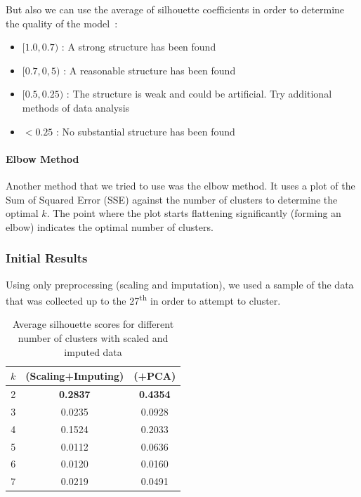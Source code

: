 But also we can use the average of silhouette coefficients in order to determine the quality of the model~\cite{silhouette}:
\begin{itemize}[topsep=0pt,noitemsep]
	\item $[1.0,0.7)$ : A strong structure has been found
	\item $[0.7,0,5)$ : A reasonable structure has been found
	\item $[0.5,0.25)$ : The structure is weak and could be artificial. Try additional methods of data analysis
	\item $< 0.25$ : No substantial structure has been found
\end{itemize}

\paragraph{Elbow Method}
Another method that we tried to use was the elbow method. It uses a plot of the Sum of Squared Error (SSE) against the number of clusters to determine the optimal $k$. The point where the plot starts flattening significantly (forming an elbow) indicates the optimal number of clusters. 

\subsubsection{Initial Results}
Using only preprocessing (scaling and imputation), we used a sample of the data that was collected up to the 27\textsuperscript{th} in order to attempt to cluster. 

\begin{table}[h]
\begin{center}
\begin{tabular}{c c c}
\hline
\textbf{$k$} & \textbf{(Scaling+Imputing)} & \textbf{(+PCA)}\\ 
\hline\hline
2 & \textbf{0.2837} & \textbf{0.4354}\\
3 & 0.0235 & 0.0928\\
4 & 0.1524 & 0.2033\\
5 & 0.0112 & 0.0636\\
6 & 0.0120 & 0.0160\\
7 & 0.0219 & 0.0491\\
\end{tabular}
\end{center}
\caption{\label{silh_scor_simple}Average silhouette scores for different number of clusters with scaled and imputed data}
\end{table}

